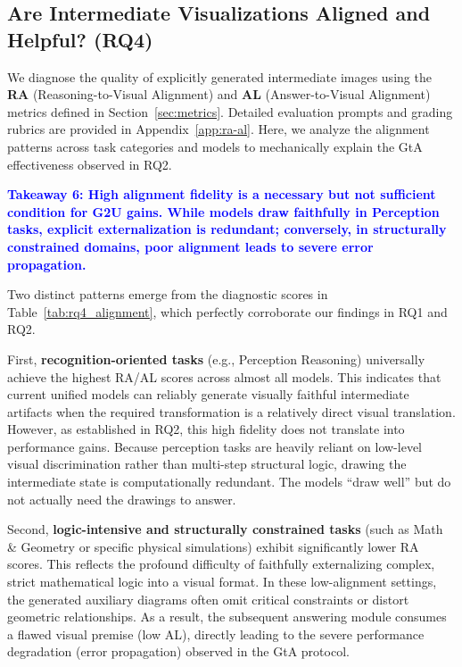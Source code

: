 \documentclass{article}
\theoremstyle{plain}
\theoremstyle{definition}
\theoremstyle{remark}
\begin{document}
\subsection{Are Intermediate Visualizations Aligned and Helpful? (RQ4)}
\label{sec:rq4}

We diagnose the quality of explicitly generated intermediate images using the \textbf{RA} (Reasoning-to-Visual Alignment) and \textbf{AL} (Answer-to-Visual Alignment) metrics defined in Section~\ref{sec:metrics}. Detailed evaluation prompts and grading rubrics are provided in Appendix~\ref{app:ra-al}. Here, we analyze the alignment patterns across task categories and models to mechanically explain the GtA effectiveness observed in RQ2.

\textbf{\textcolor{blue}{Takeaway 6: High alignment fidelity is a necessary but not sufficient condition for G2U gains. While models draw faithfully in Perception tasks, explicit externalization is redundant; conversely, in structurally constrained domains, poor alignment leads to severe error propagation.}}

Two distinct patterns emerge from the diagnostic scores in Table~\ref{tab:rq4_alignment}, which perfectly corroborate our findings in RQ1 and RQ2. 

First, \textbf{recognition-oriented tasks} (e.g., Perception Reasoning) universally achieve the highest RA/AL scores across almost all models. This indicates that current unified models can reliably generate visually faithful intermediate artifacts when the required transformation is a relatively direct visual translation. However, as established in RQ2, this high fidelity does not translate into performance gains. Because perception tasks are heavily reliant on low-level visual discrimination rather than multi-step structural logic, drawing the intermediate state is computationally redundant. The models ``draw well'' but do not actually need the drawings to answer.

Second, \textbf{logic-intensive and structurally constrained tasks} (such as Math \& Geometry or specific physical simulations) exhibit significantly lower RA scores. This reflects the profound difficulty of faithfully externalizing complex, strict mathematical logic into a visual format. In these low-alignment settings, the generated auxiliary diagrams often omit critical constraints or distort geometric relationships. As a result, the subsequent answering module consumes a flawed visual premise (low AL), directly leading to the severe performance degradation (error propagation) observed in the GtA protocol.
\end{document}
